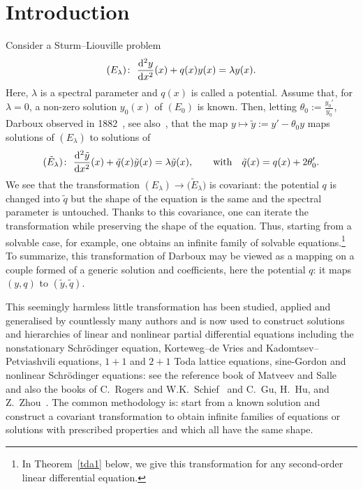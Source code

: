 \documentclass[pdftex]{sigma}%
\numberwithin{equation}{section}
\begin{document}
\section{Introduction}
Consider a Sturm--Liouville problem
\begin{gather*}
(E_{\lambda}) \colon \ \frac{{\rm d}^2 y}{{\rm d}x^2}(x)+ q(x) y(x) = \lambda y(x).
\end{gather*}
Here, $ \lambda$ is a spectral parameter
and $q(x)$ is called a potential. Assume that, for $\lambda=0$, a non-zero solution $y_0(x)$ of $(E_0)$ is known.
Then, letting $\theta_0:=\frac{y_0'}{y_0}$, Darboux observed in 1882~\cite{da1}, see also~\cite{da,da2}, that the map $y\mapsto \tilde{y}:= y'-\theta_0 y$
maps solutions of $(E_{\lambda})$ to solutions of
\begin{gather*}
(\tilde{E}_{\lambda})\colon\ \frac{{\rm d}^2\tilde{y}}{{\rm d}x^2}(x) + \tilde{q}(x) \tilde{y}(x) = \lambda \tilde{y}(x),\qquad
	\textrm{with}\quad \tilde{q}(x) = q(x) + 2 \theta_0'.
\end{gather*}
We see that the transformation $({E}_{\lambda})\rightarrow \big(\tilde{E}_{\lambda}\big)$ is covariant: the potential $q$ is changed into $\tilde{q}$ but the shape of the equation is the same and the spectral parameter is untouched. Thanks to this covariance, one can iterate the transformation while preserving the shape of the equation. Thus, starting from a solvable case, for example, one obtains an infinite family of solvable equations.\footnote{In Theorem~\ref{tda1} below, we give this transformation for any second-order linear differential equation.}
To summarize, this transformation of Darboux may be viewed as a mapping on a couple formed of a generic solution and coefficients, here the potential $q$: it maps $(y,q)$ to $(\tilde{y},\tilde{q})$.

This seemingly harmless little transformation has been studied, applied and generalised by countlessly many authors and is now used to construct solutions and hierarchies of linear and nonlinear partial differential equations including the nonstationary Schr\"odinger equation, Korteweg--de Vries
and Kadomtsev--Petviashvili equations, $1 + 1$ and $2+1$ Toda lattice equations,
sine-Gordon and nonlinear Schr\"odinger equations: see the reference book of Matveev and Salle~\cite{MaSa91a} and also the books of
C.~Rogers and W.K.~Schief~\cite{RoSc02h} and C.~Gu, H.~Hu, and Z.~Zhou~\cite{GHZ}.
The common methodology is: start from a known solution and construct a covariant transformation to obtain infinite families of equations or solutions with prescribed properties and which all have the same shape.
\end{document}
